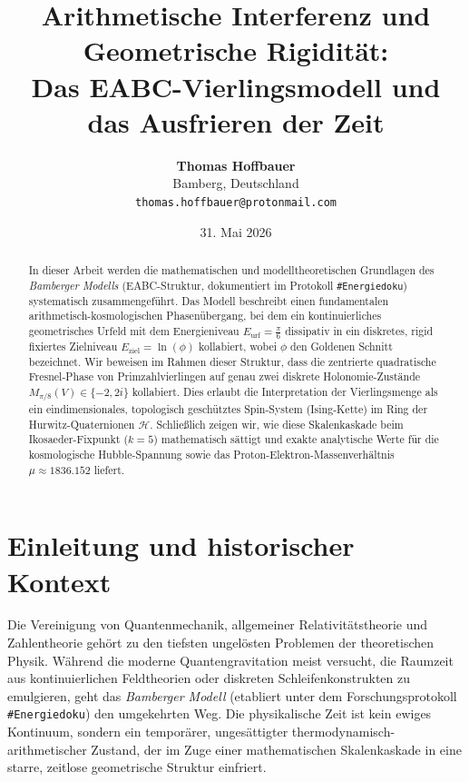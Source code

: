 \documentclass[11pt,a4paper]{article}
\theoremstyle{plain}
\theoremstyle{definition}
\numberwithin{equation}{section}
\begin{document}
\title{\textbf{Arithmetische Interferenz und Geometrische Rigidität:\\
Das EABC-Vierlingsmodell und das Ausfrieren der Zeit}}
\author{\textbf{Thomas Hoffbauer} \\
Bamberg, Deutschland \\
\texttt{thomas.hoffbauer@protonmail.com} }
\date{31. Mai 2026}

\maketitle

\begin{abstract}
In dieser Arbeit werden die mathematischen und modelltheoretischen Grundlagen des \emph{Bamberger Modells} (EABC-Struktur, dokumentiert im Protokoll \texttt{\#Energiedoku}) systematisch zusammengeführt. Das Modell beschreibt einen fundamentalen arithmetisch-kosmologischen Phasenübergang, bei dem ein kontinuierliches geometrisches Urfeld mit dem Energieniveau $E_{\text{urf}}=\frac{\pi}{6}$ dissipativ in ein diskretes, rigid fixiertes Zielniveau $E_{\text{ziel}}=\ln(\phi)$ kollabiert, wobei $\phi$ den Goldenen Schnitt bezeichnet. Wir beweisen im Rahmen dieser Struktur, dass die zentrierte quadratische Fresnel-Phase von Primzahlvierlingen auf genau zwei diskrete Holonomie-Zustände $M_{\pi/8}(V) \in \{-2, 2i\}$ kollabiert. Dies erlaubt die Interpretation der Vierlingsmenge als ein eindimensionales, topologisch geschütztes Spin-System (Ising-Kette) im Ring der Hurwitz-Quaternionen $\mathcal{H}$. Schließlich zeigen wir, wie diese Skalenkaskade beim Ikosaeder-Fixpunkt ($k=5$) mathematisch sättigt und exakte analytische Werte für die kosmologische Hubble-Spannung sowie das Proton-Elektron-Massenverhältnis $\mu \approx 1836.152$ liefert.
\end{abstract}

\newpage
\tableofcontents
\newpage

\section{Einleitung und historischer Kontext}
Die Vereinigung von Quantenmechanik, allgemeiner Relativitätstheorie und Zahlentheorie gehört zu den tiefsten ungelösten Problemen der theoretischen Physik. Während die moderne Quantengravitation meist versucht, die Raumzeit aus kontinuierlichen Feldtheorien oder diskreten Schleifenkonstrukten zu emulgieren, geht das \emph{Bamberger Modell} (etabliert unter dem Forschungsprotokoll \texttt{\#Energiedoku}) den umgekehrten Weg. Die physikalische Zeit ist kein ewiges Kontinuum, sondern ein temporärer, ungesättigter thermodynamisch-arithmetischer Zustand, der im Zuge einer mathematischen Skalenkaskade in eine starre, zeitlose geometrische Struktur einfriert.
\end{document}

